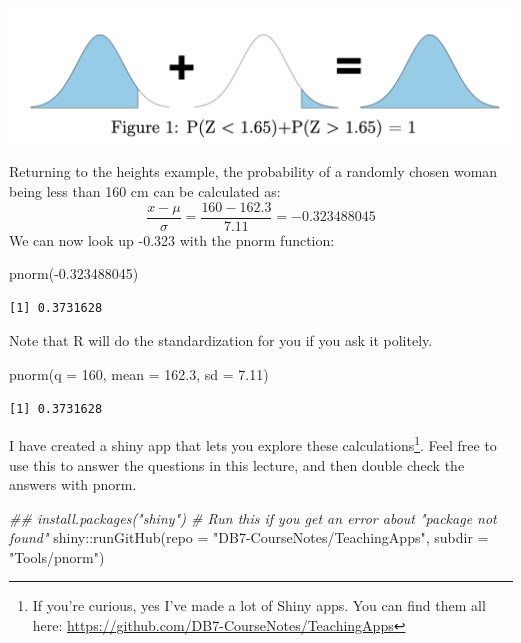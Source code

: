 \documentclass[
  letterpaper,
  DIV=11,
  numbers=noendperiod,
  oneside]{scrreprt}
\newenvironment{Shaded}{\begin{snugshade}}{\end{snugshade}}
\newcommand{\AttributeTok}[1]{\textcolor[rgb]{0.40,0.45,0.13}{#1}}
\newcommand{\DecValTok}[1]{\textcolor[rgb]{0.68,0.00,0.00}{#1}}
\newcommand{\DocumentationTok}[1]{\textcolor[rgb]{0.37,0.37,0.37}{\textit{#1}}}
\newcommand{\FloatTok}[1]{\textcolor[rgb]{0.68,0.00,0.00}{#1}}
\newcommand{\FunctionTok}[1]{\textcolor[rgb]{0.28,0.35,0.67}{#1}}
\newcommand{\NormalTok}[1]{\textcolor[rgb]{0.00,0.23,0.31}{#1}}
\newcommand{\SpecialCharTok}[1]{\textcolor[rgb]{0.37,0.37,0.37}{#1}}
\newcommand{\StringTok}[1]{\textcolor[rgb]{0.13,0.47,0.30}{#1}}
\begin{document}
\includegraphics{figs/addgraphs.jpg}

Returning to the heights example, the probability of a randomly chosen
woman being less than 160 cm can be calculated as: \[
\frac{x - \mu}{\sigma} = \frac{160 - 162.3}{7.11} = -0.323488045
\] We can now look up -0.323 with the pnorm function:

\begin{Shaded}
\begin{Highlighting}[]
\FunctionTok{pnorm}\NormalTok{(}\SpecialCharTok{{-}}\FloatTok{0.323488045}\NormalTok{)}
\end{Highlighting}
\end{Shaded}

\begin{verbatim}
[1] 0.3731628
\end{verbatim}

Note that R will do the standardization for you if you ask it politely.

\begin{Shaded}
\begin{Highlighting}[]
\FunctionTok{pnorm}\NormalTok{(}\AttributeTok{q =} \DecValTok{160}\NormalTok{, }\AttributeTok{mean =} \FloatTok{162.3}\NormalTok{, }\AttributeTok{sd =} \FloatTok{7.11}\NormalTok{)}
\end{Highlighting}
\end{Shaded}

\begin{verbatim}
[1] 0.3731628
\end{verbatim}

I have created a shiny app that lets you explore these
calculations\footnote{If you're curious, yes I've made a lot of Shiny
  apps. You can find them all here:
  \url{https://github.com/DB7-CourseNotes/TeachingApps}}. Feel free to
use this to answer the questions in this lecture, and then double check
the answers with pnorm.

\begin{Shaded}
\begin{Highlighting}[]
\DocumentationTok{\#\# install.packages("shiny") \# Run this if you get an error about "package not found"}
\NormalTok{shiny}\SpecialCharTok{::}\FunctionTok{runGitHub}\NormalTok{(}\AttributeTok{repo =} \StringTok{"DB7{-}CourseNotes/TeachingApps"}\NormalTok{, }
    \AttributeTok{subdir =} \StringTok{"Tools/pnorm"}\NormalTok{)}
\end{Highlighting}
\end{Shaded}
\end{document}
